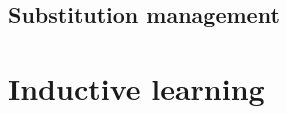 \documentclass[12pt, a4paper]{report}
\begin{document}
\section{Substitution management}

\chapter{Inductive learning}




\clearpage
{}
{}


\end{document}

